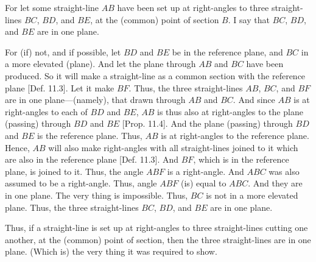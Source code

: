 \begin{Parallel}{}{}
{
\centerline{}

For let some straight-line $AB$ have been set up at right-angles
to three straight-lines $BC$, $BD$, and $BE$, at the (common) point of
section $B$. I say that $BC$, $BD$, and $BE$ are in  one plane.

For (if) not, and if possible, let $BD$ and $BE$ be in the reference plane,
and $BC$ in a more elevated (plane).  And let the plane through $AB$ and
$BC$ have been produced. So it will make a straight-line as a
common section with the reference plane [Def. 11.3]. 
Let it make $BF$. Thus, the three straight-lines $AB$, $BC$, and $BF$
are in one plane---(namely), that drawn through $AB$ and $BC$. And since
$AB$ is at right-angles to each of $BD$ and $BE$, $AB$ is thus also at right-angles to the plane (passing) through $BD$ and $BE$ [Prop. 11.4]. And the plane (passing)
through $BD$ and $BE$ is the reference plane. Thus, $AB$ is at
right-angles to the reference plane. Hence, $AB$ will also make right-angles
with all straight-lines joined to it which are also in the reference plane [Def. 11.3].
And $BF$, which is in the reference plane, is joined to  it. Thus, the angle
$ABF$ is a right-angle. And $ABC$ was also assumed to be a right-angle.
Thus, angle $ABF$ (is) equal to $ABC$. And they are in one
plane. The very thing is impossible. Thus, $BC$ is not in a more elevated
plane. Thus, the three straight-lines $BC$, $BD$, and $BE$ are in one plane.

Thus, if a straight-line is set up at right-angles to three straight-lines cutting
one another, at the (common) point of section, then the three straight-lines
are in one plane. (Which is) the very thing it was required to show.}
\end{Parallel}

